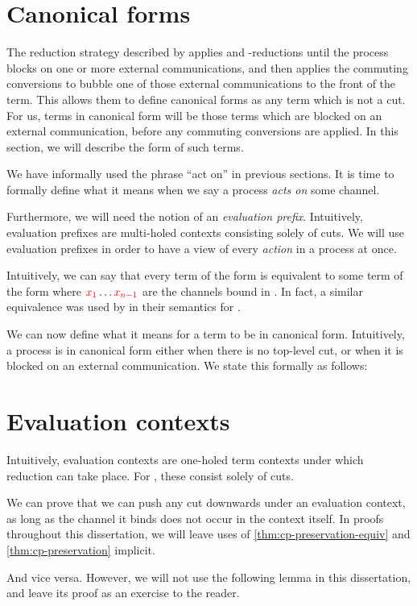 \section{Canonical forms}\label{sec:cp-canonical-forms}
The reduction strategy described by \citeauthor{lindley2015semantics} applies
 and \textbeta-reductions until the process blocks on
one or more external communications, and then applies the commuting conversions
to bubble one of those external communications to the front of the term.
This allows them to define canonical forms as any term which is not a cut.
For us, terms in canonical form will be those terms which are blocked on an
external communication, before any commuting conversions are applied.
In this section, we will describe the form of such terms.

We have informally used the phrase ``act on'' in previous sections. It is time
to formally define what it means when we say a process \emph{acts on} some
channel.

Furthermore, we will need the notion of an \emph{evaluation prefix}.
Intuitively, evaluation prefixes are multi-holed contexts consisting solely of
cuts. We will use evaluation prefixes in order to have a view of every
\emph{action} in a process at once.

Intuitively, we can say that every term of the form
 is equivalent to some term of the form
where $\textcolor{red}{x_1} \dots \textcolor{red}{x_{n-1}}$ are the channels bound in .
In fact, a similar equivalence was used by \citeauthor{lindley2015semantics}
\parencite{lindley2015semantics} in their semantics for \cp. 

We can now define what it means for a term to be in canonical form. Intuitively,
a process is in canonical form either when there is no top-level cut, or when it
is blocked on an external communication. We state this formally as follows:


\section{Evaluation contexts}\label{sec:cp-evaluation-contexts}
Intuitively, evaluation contexts are one-holed term contexts under which
reduction can take place. For \rcp, these consist solely of cuts.

We can prove that we can push any cut downwards under an evaluation context, as
long as the channel it binds does not occur in the context itself.
In proofs throughout this dissertation, we will leave uses of
\cref{thm:cp-preservation-equiv} and \cref{thm:cp-preservation} implicit.

And vice versa. However, we will not use the following lemma in this
dissertation, and leave its proof as an exercise to the reader.


